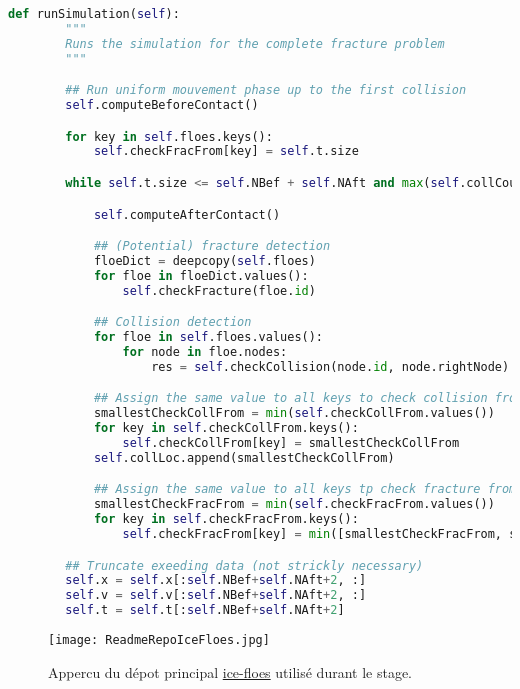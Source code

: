 \vspace{0.3cm}
\begin{lstlisting}[language=Python,breaklines,caption={Code de simulation 1D.},captionpos=b,label={code}]
    def runSimulation(self):
        """
        Runs the simulation for the complete fracture problem
        """

        ## Run uniform mouvement phase up to the first collision
        self.computeBeforeContact()

        for key in self.floes.keys():
            self.checkFracFrom[key] = self.t.size

        while self.t.size <= self.NBef + self.NAft and max(self.collCount.values()) < 1000:

            self.computeAfterContact()

            ## (Potential) fracture detection 
            floeDict = deepcopy(self.floes)
            for floe in floeDict.values():
                self.checkFracture(floe.id)

            ## Collision detection 
            for floe in self.floes.values():
                for node in floe.nodes:
                    res = self.checkCollision(node.id, node.rightNode)

            ## Assign the same value to all keys to check collision from now on
            smallestCheckCollFrom = min(self.checkCollFrom.values())
            for key in self.checkCollFrom.keys():
                self.checkCollFrom[key] = smallestCheckCollFrom
            self.collLoc.append(smallestCheckCollFrom)

            ## Assign the same value to all keys tp check fracture from now on
            smallestCheckFracFrom = min(self.checkFracFrom.values())
            for key in self.checkFracFrom.keys():
                self.checkFracFrom[key] = min([smallestCheckFracFrom, smallestCheckCollFrom])

        ## Truncate exeeding data (not strickly necessary)  
        self.x = self.x[:self.NBef+self.NAft+2, :]
        self.v = self.v[:self.NBef+self.NAft+2, :]
        self.t = self.t[:self.NBef+self.NAft+2]
\end{lstlisting}

\begin{figure}[!h]
    \centering
    \texttt{[image: ReadmeRepoIceFloes.jpg]}
    \caption{Appercu du dépot principal \href{https://github.com/desmond-rn/ice-floes}{ice-floes} utilisé durant le stage.}
    \label{fig:readme1d}
\end{figure}


